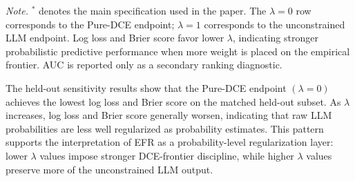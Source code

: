 \documentclass[11pt]{article}
\begin{document}
\begin{table}[htbp]
\vspace{0.3em}
\begin{minipage}{0.92\textwidth}
\small
\textit{Note.} \(^*\) denotes the main specification used in the paper. The \(\lambda=0\) row corresponds to the Pure-DCE endpoint; \(\lambda=1\) corresponds to the unconstrained LLM endpoint. Log loss and Brier score favor lower \(\lambda\), indicating stronger probabilistic predictive performance when more weight is placed on the empirical frontier. AUC is reported only as a secondary ranking diagnostic.
\end{minipage}
\end{table}

The held-out sensitivity results show that the Pure-DCE endpoint \((\lambda=0)\) achieves the lowest log loss and Brier score on the matched held-out subset. As \(\lambda\) increases, log loss and Brier score generally worsen, indicating that raw LLM probabilities are less well regularized as probability estimates. This pattern supports the interpretation of EFR as a probability-level regularization layer: lower \(\lambda\) values impose stronger DCE-frontier discipline, while higher \(\lambda\) values preserve more of the unconstrained LLM output.
\end{document}
